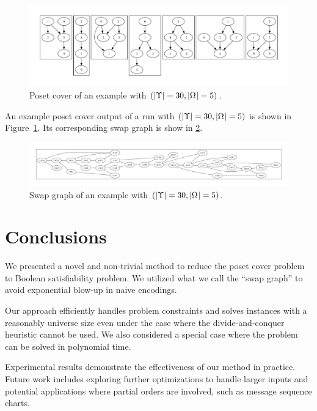 \documentclass[12pt]{llncs}
\DeclarePairedDelimiter{\abs}{\lvert}{\rvert}
\newcommand{\uni}[1][]{\Omega_{#1}}
\begin{document}
\begin{figure}[h]
    \centering
    \includegraphics[width=0.9\linewidth]{cover_example}
    \caption{Poset cover of an example with $(\abs{\Upsilon} = 30, \abs{\uni} = 5)$.}
    \label{figure:cover_exp}
\end{figure}

An example poset cover output of a run with $(\abs{\Upsilon} = 30, \abs{\uni} = 5)$ is shown in Figure~\ref{figure:cover_exp}. Its corresponding swap graph is show in \ref{figure:swap_exp}.

\begin{figure}[h]
    \centering
    \includegraphics[width=0.9\linewidth]{swap_graph_example}
    \caption{Swap graph of an example with $(\abs{\Upsilon} = 30, \abs{\uni} = 5)$.}
    \label{figure:swap_exp}
\end{figure}

\section{Conclusions}

We presented a novel and non-trivial method to reduce the poset cover problem to Boolean satisfiability problem. We utilized what we call the ``swap graph'' to avoid exponential blow-up in naive encodings.

Our approach efficiently handles problem constraints and solves instances with a reasonably universe size even under the case where the divide-and-conquer heuristic cannot be used. We also considered a special case where the problem can be solved in polynomial time.

Experimental results demonstrate the effectiveness of our method in practice. Future work includes exploring further optimizations to handle larger inputs and potential applications where partial orders are involved, such as message sequence charts.
\end{document}
